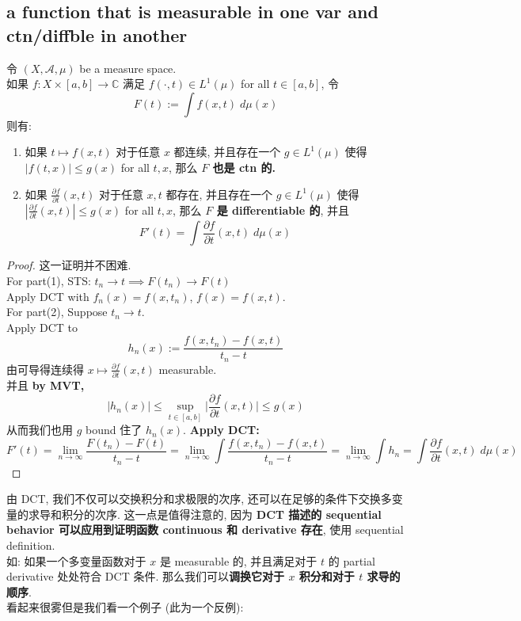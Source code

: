 \documentclass[lang=cn,11pt]{elegantbook}
\begin{document}
\subsection{a function that is measurable in one var and ctn/diffble in another}

\begin{corollary}
  令 $(X,\mathcal{A}, \mu)$ be a measure space.\\
  如果 $f: X \times [a,b] \to \mathbb{C}$ 满足 $f(\cdot, t) \in L^1(\mu)$ for all $t \in [a,b]$, 令 \[
F(t) := \int f(x,t) \; d\mu(x)
  \] 则有:
  \begin{enumerate}
      \item 如果 $t \mapsto f(x,t) $  对于任意 $x$ 都连续, 并且存在一个 $g \in L^1(\mu)$ 使得 $|f(t,x)| \leq g(x)$ for all $t,x$, 那么 \textbf{$F$ 也是 ctn 的.}
      \item 如果 $\frac{\partial f}{\partial t} (x,t)$ 对于任意 $x,t$ 都存在, 并且存在一个 $g \in L^1(\mu)$ 使得 $|\frac{\partial f}{\partial t} (x,t)| \leq g(x)$ for all $t,x$, 那么 \textbf{$F$ 是 differentiable 的}, 并且 $$F'(t) = \int \frac{\partial f}{\partial t} (x,t) \; d\mu(x)$$
  \end{enumerate}
\end{corollary}
\begin{proof}
    这一证明并不困难.\\
    For part(1), STS: $t_n \to t \implies F(t_n) \to F(t)$\\
    Apply DCT with $f_n(x) = f(x,t_n)$, $f(x) = f(x,t)$.\\
    For part(2), Suppose $t_n \to t$.\\
    Apply DCT to \[
    h_n(x) := \frac{f(x,t_n) - f(x,t)}{t_n - t}
    \]
    由可导得连续得 $x \mapsto \frac{\partial f}{\partial t}(x,t)$ measurable.\\
    并且 \textbf{by MVT, }\[
    |h_n(x)| \leq \sup_{t \in [a,b]} \Big| \frac{\partial f}{\partial t} (x,t) \Big| \leq g(x)
    \]
    从而我们也用 $g$ bound 住了 $h_n(x)$. \textbf{Apply DCT: }\[
  F'(t) = \lim_{n\to \infty}  \frac{F(t_n) - F(t)}{t_n -t}  =  \lim_{n\to \infty} \int \frac{f(x, t_n) - f(x,t)}{t_n - t} = \lim_{n\to \infty} \int h_n  = \int \frac{\partial f}{\partial t} (x,t) \; d\mu(x)
    \]
\end{proof}
\begin{remark}
    由 DCT, 我们不仅可以交换积分和求极限的次序, 还可以在足够的条件下交换多变量的求导和积分的次序. 这一点是值得注意的, 因为 \textbf{DCT 描述的 sequential behavior 可以应用到证明函数 continuous 和 derivative 存在}, 使用 sequential definition. \\
    如: 如果一个多变量函数对于 $x$ 是 measurable 的, 并且满足对于 $t$ 的 partial derivative 处处符合 DCT 条件. 那么我们可以\textbf{调换它对于 $x$ 积分和对于 $t$ 求导的顺序}.\\
    看起来很雾但是我们看一个例子 (此为一个反例):
\end{remark}
\end{document}

